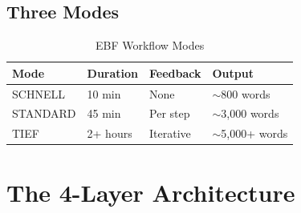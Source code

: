 \subsection{Three Modes}

\begin{table}[htbp]
\centering
\caption{EBF Workflow Modes}
\label{tab:workflow-modes}
\renewcommand{\arraystretch}{1.3}
\begin{tabular}{@{}llll@{}}
\toprule
\textbf{Mode} & \textbf{Duration} & \textbf{Feedback} & \textbf{Output} \\
\midrule
SCHNELL & 10 min & None & $\sim$800 words \\
STANDARD & 45 min & Per step & $\sim$3,000 words \\
TIEF & 2+ hours & Iterative & $\sim$5,000+ words \\
\bottomrule
\end{tabular}
\end{table}


\section{The 4-Layer Architecture}
\label{sec:ref-ebf-architecture}

